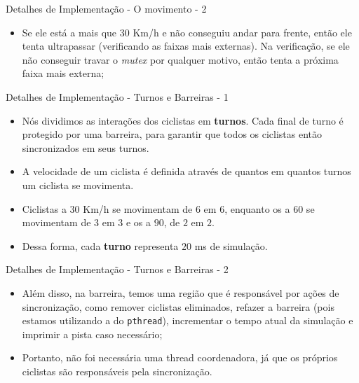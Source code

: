 \documentclass[10pt]{beamer}
\begin{document}
    \begin{frame}{Detalhes de Implementação - O movimento - 2}
      \begin{itemize}
        \justifying
        \item Se ele está a mais que $30$ Km/h e não conseguiu andar para
          frente, então ele tenta ultrapassar (verificando as faixas mais
          externas). Na verificação, se ele não conseguir travar o
          \textit{mutex} por qualquer motivo, então tenta a próxima faixa mais
          externa;
      \end{itemize}
    \end{frame}

    \begin{frame}{Detalhes de Implementação - Turnos e Barreiras - 1}
      \begin{itemize}
        \justifying
        \item Nós dividimos as interações dos ciclistas em \textbf{turnos}. Cada
          final de turno é protegido por uma barreira, para garantir que todos
          os ciclistas então sincronizados em seus turnos.
        \item A velocidade de um ciclista é definida através de quantos em
          quantos turnos um ciclista se movimenta.
        \item Ciclistas a $30$ Km/h se movimentam de $6$ em $6$, enquanto os a
          $60$ se movimentam de $3$ em $3$ e os a $90$, de $2$ em $2$.
        \item Dessa forma, cada \textbf{turno} representa $20$ ms de simulação.
      \end{itemize}
    \end{frame}

    \begin{frame}{Detalhes de Implementação - Turnos e Barreiras - 2}
      \begin{itemize}
        \justifying
      \item Além disso, na barreira, temos uma região que é responsável por
        ações de sincronização, como remover ciclistas eliminados, refazer a
        barreira (pois estamos utilizando a do \texttt{pthread}), incrementar o
        tempo atual da simulação e imprimir a pista caso necessário;
      \item Portanto, não foi necessária uma thread coordenadora, já que os
        próprios ciclistas são responsáveis pela sincronização.
      \end{itemize}
    \end{frame}
\end{document}
